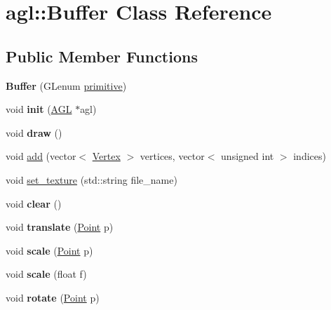 \hypertarget{classagl_1_1Buffer}{}\section{agl\+::Buffer Class Reference}
\label{classagl_1_1Buffer}
\subsection*{Public Member Functions}
\begin{DoxyCompactItemize}
\item 
\mbox{\label{classagl_1_1Buffer_a53a537292cdc2108ea73361566e48754}} 
{\bfseries Buffer} (G\+Lenum \mbox{\hyperlink{classagl_1_1Buffer_a58c9e34d415980f2e19b8774ddac22dc}{primitive}})
\item 
\mbox{\label{classagl_1_1Buffer_ad5d722676b6b8913e0f9aad77bd0d04a}} 
void {\bfseries init} (\mbox{\hyperlink{classagl_1_1AGL}{A\+GL}} $\ast$agl)
\item 
\mbox{\label{classagl_1_1Buffer_aa59b7d8256c2f6d1efc71b47ecd8dc91}} 
void {\bfseries draw} ()
\item 
void \mbox{\hyperlink{classagl_1_1Buffer_ae1d1a6b36fc4d53385c0a58db550603a}{add}} (vector$<$ \mbox{\hyperlink{classagl_1_1Vertex}{Vertex}} $>$ vertices, vector$<$ unsigned int $>$ indices)
\item 
void \mbox{\hyperlink{classagl_1_1Buffer_a245a48fb5cfa9d8208f4891b6b784f60}{set\+\_\+texture}} (std\+::string file\+\_\+name)
\item 
\mbox{\label{classagl_1_1Buffer_a604261e4a40cc3f002e91a83b1fc3163}} 
void {\bfseries clear} ()
\item 
\mbox{\label{classagl_1_1Buffer_a54fa23f9275a8bacb6f4d5d32025eb1a}} 
void {\bfseries translate} (\mbox{\hyperlink{classagl_1_1Point}{Point}} p)
\item 
\mbox{\label{classagl_1_1Buffer_aaed5aa91be4da940778b52864f4b4946}} 
void {\bfseries scale} (\mbox{\hyperlink{classagl_1_1Point}{Point}} p)
\item 
\mbox{\label{classagl_1_1Buffer_af272ae7a5e8a50e64ab5ff97f803948c}} 
void {\bfseries scale} (float f)
\item 
\mbox{\label{classagl_1_1Buffer_a558d7bf5034d6133a69193c97234efae}} 
void {\bfseries rotate} (\mbox{\hyperlink{classagl_1_1Point}{Point}} p)
\end{DoxyCompactItemize}
